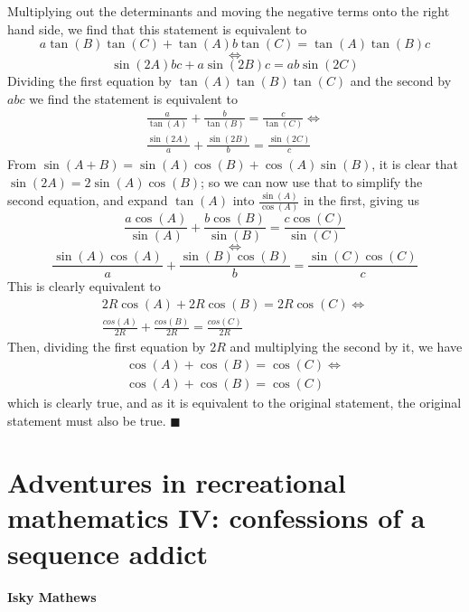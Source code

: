 \documentclass[11pt,a4paper]{report}
\begin{document}
\begin{multicols}{2}
		Multiplying out the determinants and moving the negative terms onto the right hand side, we find that this statement is equivalent to
		\[a\tan(B)\tan(C)+\tan(A)b\tan(C)=\tan(A)\tan(B)c\]\[\iff{}\]\[\sin(2A)bc+a\sin(2B)c=ab\sin(2C)
		\]
		Dividing the first equation by \(\tan(A)\tan(B)\tan(C)\) and the second by \(abc\) we find the statement is equivalent to
		\[
		\begin{split}
		\frac{a}{\tan(A)}+\frac{b}{\tan(B)}=\frac{c}{\tan(C)} 
		\iff \\
		\frac{\sin(2A)}{a}+\frac{\sin(2B)}{b}=\frac{\sin(2C)}{c}
		\end{split}
		\]
		From \(\sin(A+B)=\sin(A)\cos(B)+\cos(A)\sin(B)\), it is clear that \(\sin(2A)=2\sin(A)\cos(B)\); so we can now use that to simplify the second equation, and expand \(\tan(A)\) into \(\frac{\sin(A)}{\cos(A)}\) in the first, giving us
		\[
		\frac{a\cos(A)}{\sin(A)}+\frac{b\cos(B)}{\sin(B)}=\frac{c\cos(C)}{\sin(C)}\]
		\[\iff\]
		\[\frac{\sin(A)\cos(A)}{a}+\frac{\sin(B)\cos(B)}{b}=\frac{\sin(C)\cos(C)}{c}
		\]
		This is clearly equivalent to
		\[\begin{split}
		2R\cos(A)+2R\cos(B)=2R\cos(C)
		\iff\\
		\frac{cos(A)}{2R}+\frac{cos(B)}{2R}=\frac{cos(C)}{2R}
		\end{split}
		\]
		Then, dividing the first equation by \(2R\) and multiplying the second by it, we have
		\[\begin{split}
		\cos(A)+\cos(B)=\cos(C)
		\iff\\
		\cos(A)+\cos(B)=\cos(C)
		\end{split}
		\]
		which is clearly true, and as it is equivalent to the original statement, the original statement must also be true. \(\blacksquare{}\)
		
	\end{multicols}
	
	\section{Adventures in recreational mathematics IV: confessions of a sequence addict}
	
	\textbf{Isky Mathews}
	
\end{document}
